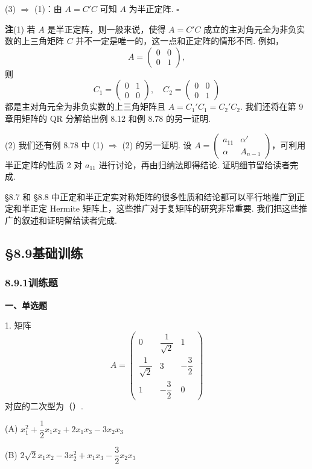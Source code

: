 \documentclass[UTF8,12pt,a4paper,fontset=fandol]{ctexart}
\begin{document}
(3) $\Rightarrow$ (1)：由 $A=C'C$ 可知 $A$ 为半正定阵. $\ensuremath{\square}$

\noindent\textbf{注}\quad (1) 若 $A$ 是半正定阵，则一般来说，使得 $A=C'C$ 成立的主对角元全为非负实数的上三角矩阵 $C$ 并不一定是唯一的，这一点和正定阵的情形不同. 例如，
\[
A=\left(\begin{array}{cc}0&0\\ 0&1\end{array}\right),
\]
则
\[
C_1=\left(\begin{array}{cc}0&1\\ 0&0\end{array}\right),\quad
C_2=\left(\begin{array}{cc}0&0\\ 0&1\end{array}\right)
\]
都是主对角元全为非负实数的上三角矩阵且 $A=C_1'C_1=C_2'C_2$. 我们还将在第 9 章用矩阵的 QR 分解给出例 8.12 和例 8.78 的另一证明.

(2) 我们还有例 8.78 中 (1) $\Rightarrow$ (2) 的另一证明. 设 $A=\left(\begin{array}{cc}a_{11}&\alpha'\\ \alpha&A_{n-1}\end{array}\right)$，可利用半正定阵的性质 2 对 $a_{11}$ 进行讨论，再由归纳法即得结论. 证明细节留给读者完成.

§8.7 和 §8.8 中正定和半正定实对称矩阵的很多性质和结论都可以平行地推广到正定和半正定 Hermite 矩阵上，这些推广对于复矩阵的研究非常重要. 我们把这些推广的叙述和证明留给读者完成.

\subsection*{§8.9\quad 基础训练}

\subsubsection*{8.9.1\quad 训练题}

\noindent\textbf{一、单选题}

1. 矩阵
\[
A=\left(\begin{array}{ccc}
0 & \dfrac1{\sqrt2} & 1\\
\dfrac1{\sqrt2} & 3 & -\dfrac32\\
1 & -\dfrac32 & 0
\end{array}\right)
\]
对应的二次型为（\quad ）.

(A) $x_1^2+\dfrac12x_1x_2+2x_1x_3-3x_2x_3$

(B) $2\sqrt2x_1x_2-3x_2^2+x_1x_3-\dfrac32x_2x_3$
\end{document}
